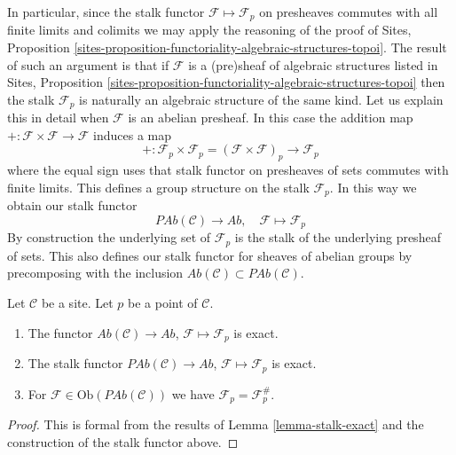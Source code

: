 \noindent
In particular, since the stalk functor $\mathcal{F} \mapsto \mathcal{F}_p$
on presheaves commutes with all finite limits and colimits we may apply the
reasoning of the proof of
Sites,
Proposition \ref{sites-proposition-functoriality-algebraic-structures-topoi}.
The result of such an argument is that if $\mathcal{F}$ is a
(pre)sheaf of algebraic structures listed in
Sites,
Proposition \ref{sites-proposition-functoriality-algebraic-structures-topoi}
then the stalk $\mathcal{F}_p$ is naturally an algebraic structure
of the same kind. Let us explain this in detail when $\mathcal{F}$
is an abelian presheaf. In this case the addition map
$+ : \mathcal{F} \times \mathcal{F} \to \mathcal{F}$ induces
a map
$$
+ :
\mathcal{F}_p \times \mathcal{F}_p
=
(\mathcal{F} \times \mathcal{F})_p
\longrightarrow
\mathcal{F}_p
$$
where the equal sign uses that stalk functor on presheaves of sets
commutes with finite limits. This defines a group structure on
the stalk $\mathcal{F}_p$. In this way we obtain
our stalk functor
$$
\textit{PAb}(\mathcal{C}) \longrightarrow \textit{Ab}, \quad
\mathcal{F} \longmapsto \mathcal{F}_p
$$
By construction the underlying set of $\mathcal{F}_p$ is the stalk of the
underlying presheaf of sets. This also defines our stalk functor for
sheaves of abelian groups by precomposing with the inclusion
$\textit{Ab}(\mathcal{C}) \subset \textit{PAb}(\mathcal{C})$.

\begin{lemma}
\label{lemma-stalk-exact-abelian}
Let $\mathcal{C}$ be a site.
Let $p$ be a point of $\mathcal{C}$.
\begin{enumerate}
\item The functor
$\textit{Ab}(\mathcal{C}) \to \textit{Ab}$,
$\mathcal{F} \mapsto \mathcal{F}_p$ is exact.
\item The stalk functor
$\textit{PAb}(\mathcal{C}) \to \textit{Ab}$,
$\mathcal{F}  \mapsto  \mathcal{F}_p$
is exact.
\item For $\mathcal{F} \in \text{Ob}(\textit{PAb}(\mathcal{C}))$
we have $\mathcal{F}_p = \mathcal{F}^\#_p$.
\end{enumerate}
\end{lemma}

\begin{proof}
This is formal from the results of
Lemma \ref{lemma-stalk-exact}
and the construction of the stalk functor above.
\end{proof}

